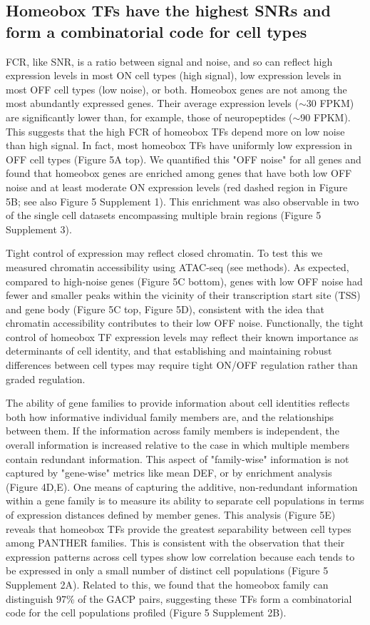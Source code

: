 \subsection{Homeobox TFs have the highest SNRs and form a combinatorial code for cell types}
FCR, like SNR, is a ratio between signal and noise, and so can reflect high expression levels in most ON cell types (high signal), low expression levels in most OFF cell types (low noise), or both. Homeobox genes are not among the most abundantly expressed genes. Their average expression levels ($\sim$30 FPKM) are significantly lower than, for example, those of neuropeptides ($\sim$90 FPKM). This suggests that the high FCR of homeobox TFs depend more on low noise than high signal. In fact, most homeobox TFs have uniformly low expression in OFF cell types (Figure 5A top). We quantified this "OFF noise" for all genes and found that homeobox genes are enriched among genes that have both low OFF noise and at least moderate ON expression levels (red dashed region in Figure 5B; see also Figure 5 Supplement 1). This enrichment was also observable in two of the single cell datasets encompassing multiple brain regions (Figure 5 Supplement 3). 

Tight control of expression may reflect closed chromatin. To test this we measured chromatin accessibility using ATAC-seq (see methods). As expected, compared to high-noise genes (Figure 5C bottom), genes with low OFF noise had fewer and smaller peaks within the vicinity of their transcription start site (TSS) and gene body (Figure 5C top, Figure 5D), consistent with the idea that chromatin accessibility contributes to their low OFF noise. Functionally, the tight control of homeobox TF expression levels may reflect their known importance as determinants of cell identity, and that establishing and maintaining robust differences between cell types may require tight ON/OFF regulation rather than graded regulation.

The ability of gene families to provide information about cell identities reflects both how informative individual family members are, and the relationships between them. If the information across family members is independent, the overall information is increased relative to the case in which multiple members contain redundant information. This aspect of "family-wise" information is not captured by "gene-wise" metrics like mean DEF, or by enrichment analysis (Figure 4D,E). One means of capturing the additive, non-redundant information within a gene family is to measure its ability to separate cell populations in terms of expression distances defined by member genes. This analysis (Figure 5E) reveals that homeobox TFs provide the greatest separability between cell types among PANTHER families. This is consistent with the observation that their expression patterns across cell types show low correlation because each tends to be expressed in only a small number of distinct cell populations (Figure 5 Supplement 2A). Related to this, we found that the homeobox family can distinguish 97\% of the GACP pairs, suggesting these TFs form a combinatorial code for the cell populations profiled (Figure 5 Supplement 2B). 

